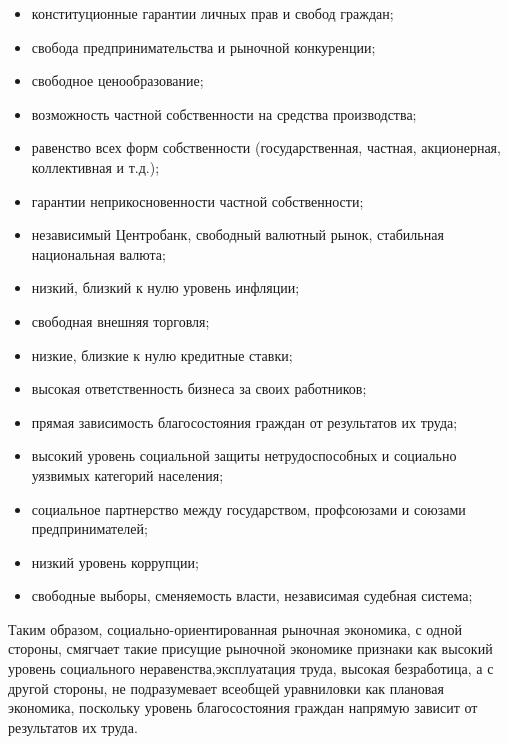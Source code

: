 \documentclass[14pt,a4paper]{article}
\begin{document}
    \begin{itemize}
        \item конституционные гарантии личных прав и свобод граждан;
        \item свобода предпринимательства и рыночной конкуренции;
        \item свободное ценообразование;
        \item возможность частной собственности на средства производства;
        \item равенство всех форм собственности (государственная, частная, акционерная, коллективная и т.д.);
        \item гарантии неприкосновенности частной собственности;
        \item независимый Центробанк, свободный валютный рынок, стабильная национальная валюта;
        \item низкий, близкий к нулю уровень инфляции;
        \item свободная внешняя торговля;
        \item низкие, близкие к нулю кредитные ставки;
        \item высокая ответственность бизнеса за своих работников;
        \item прямая зависимость благосостояния граждан от результатов их труда;
        \item высокий уровень социальной защиты нетрудоспособных и социально уязвимых категорий населения;
        \item социальное партнерство между государством, профсоюзами и союзами предпринимателей;
        \item низкий уровень коррупции;
        \item свободные выборы, сменяемость власти, независимая судебная система;
    \end{itemize}
    \par
    Таким образом, социально-ориентированная рыночная экономика, с одной стороны, смягчает такие присущие рыночной экономике признаки как высокий уровень социального неравенства,эксплуатация труда, высокая безработица, а с другой стороны, не подразумевает всеобщей уравниловки как плановая экономика, поскольку уровень благосостояния граждан напрямую зависит от результатов их труда.
\end{document}
